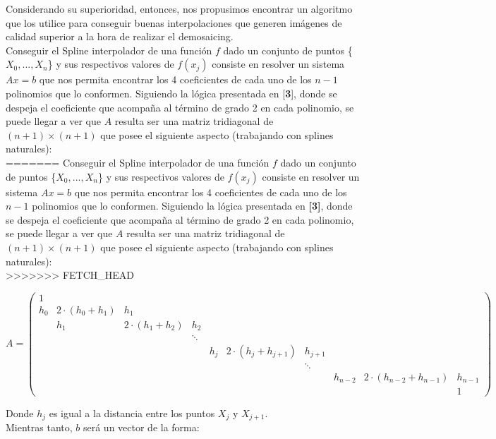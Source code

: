 \documentclass[a4paper]{article}
\begin{document}
Considerando su superioridad, entonces, nos propusimos encontrar un algoritmo que los utilice para conseguir buenas interpolaciones que generen imágenes de calidad superior a la hora de realizar el demosaicing.\\

Conseguir el Spline interpolador de una función $f$ dado un conjunto de puntos \{\(X_0, ..., X_n\)\} y sus respectivos valores de $f(x_j)$ consiste en resolver un sistema \(Ax = b\) que nos permita encontrar los 4 coeficientes de cada uno de los $n-1$ polinomios que lo conformen. Siguiendo la lógica presentada en [\textbf{3}], donde se despeja el coeficiente que acompaña al término de grado 2 en cada polinomio, se puede llegar a ver que $A$ resulta ser una matriz tridiagonal de $(n+1)\times(n+1)$ que posee el siguiente aspecto (trabajando con splines naturales): \\
=======
Conseguir el Spline interpolador de una función $f$ dado un conjunto de puntos \{\(X_0, ..., X_n\)\} y sus respectivos valores de $f(x_j)$ consiste en resolver un sistema \(Ax = b\) que nos permita encontrar los 4 coeficientes de cada uno de los $n-1$ polinomios que lo conformen. Siguiendo la lógica presentada en \textbf{[3]}, donde se despeja el coeficiente que acompaña al término de grado 2 en cada polinomio, se puede llegar a ver que $A$ resulta ser una matriz tridiagonal de $(n+1)\times(n+1)$ que posee el siguiente aspecto (trabajando con splines naturales): \\
>>>>>>> FETCH_HEAD

\[
A = \left(
\begin{array}{cccccccccc}
1 &  &  &  &  &  &  & &  & \\
h_0 & 2\cdot(h_0+h_1) & h_1 &   & & & & &  & \\
 & h_1 & 2\cdot(h_1+h_2) & h_2 & & & & &  & \\
 &  &  & \ddots &  &  &  &  &  &  \\
 &  &  &  & h_j & 2\cdot(h_j+h_{j+1}) & h_{j+1} & &  & \\
 &  &  &  &  &  & \ddots &  &  &  \\
 &  &  &  &  & & & h_{n-2} & 2\cdot(h_{n-2}+h_{n-1}) &h_{n-1}\\
 &  &  &  &  &  &  &  &  & 1
\end{array}
\right)
\]

\bigskip
\noindent Donde $h_j$ es igual a la distancia entre los puntos $X_j$ y $X_{j+1}$. \\
Mientras tanto, $b$ será un vector de la forma:
\end{document}
